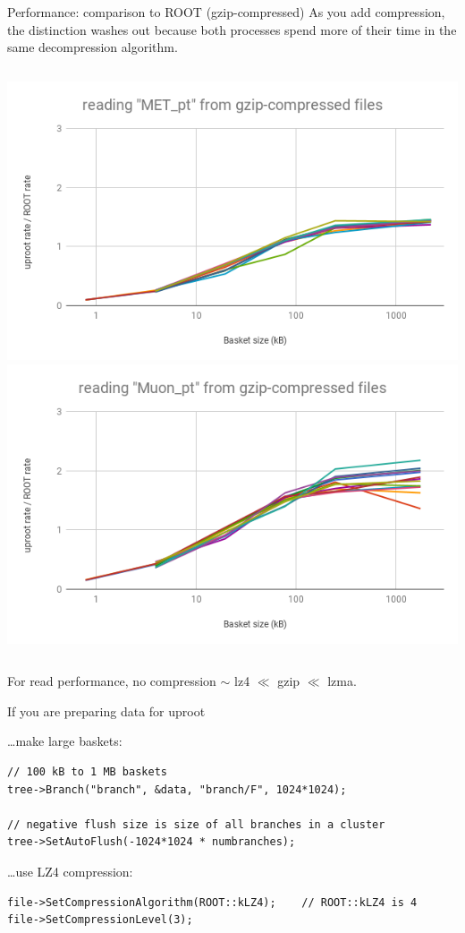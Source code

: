 \documentclass[aspectratio=169]{beamer}
\begin{document}
\begin{frame}{Performance: comparison to ROOT (gzip-compressed)}
\vspace{0.5 cm}
As you add compression, the distinction washes out because both processes spend more of their time in the same decompression algorithm.

\vspace{0.25 cm}
\begin{columns}
\includegraphics[width=0.5\linewidth]{root-gzip-met.png}
\includegraphics[width=0.5\linewidth]{root-gzip-muon.png}
\end{columns}

\vspace{0.25 cm}
For read performance, no compression $\sim$ lz4 $\ll$ gzip $\ll$ lzma.
\end{frame}

\begin{frame}[fragile]{If you are preparing data for uproot}
\vspace{0.5 cm}
\small

{\normalsize \ldots make large baskets:}

\begin{verbatim}
// 100 kB to 1 MB baskets
tree->Branch("branch", &data, "branch/F", 1024*1024);

// negative flush size is size of all branches in a cluster
tree->SetAutoFlush(-1024*1024 * numbranches);
\end{verbatim}

\vspace{0.75 cm}
{\normalsize \ldots use LZ4 compression:}

\begin{verbatim}
file->SetCompressionAlgorithm(ROOT::kLZ4);    // ROOT::kLZ4 is 4
file->SetCompressionLevel(3);
\end{verbatim}
\end{frame}
\end{document}

